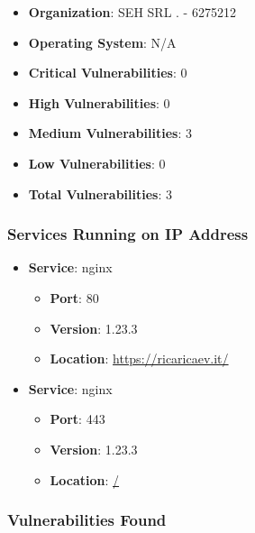 \documentclass{article}
\begin{document}
\begin{itemize}
    \item \textbf{Organization}: SEH SRL . - 6275212
    \item \textbf{Operating System}:  N/A 
    \item \textbf{Critical Vulnerabilities}: 0
    \item \textbf{High Vulnerabilities}: 0
    \item \textbf{Medium Vulnerabilities}: 3
    \item \textbf{Low Vulnerabilities}: 0
    \item \textbf{Total Vulnerabilities}: 3
\end{itemize}

\subsubsection*{Services Running on IP Address}

\begin{itemize}
    
        \item \textbf{Service}: nginx
        \begin{itemize}
            \item \textbf{Port}: 80
            \item \textbf{Version}:  1.23.3 
            \item \textbf{Location}: \href{ https://ricaricaev.it/ }{ https://ricaricaev.it/ }
        \end{itemize}
    
        \item \textbf{Service}: nginx
        \begin{itemize}
            \item \textbf{Port}: 443
            \item \textbf{Version}:  1.23.3 
            \item \textbf{Location}: \href{ / }{ / }
        \end{itemize}
    
\end{itemize}


\subsubsection*{Vulnerabilities Found}
\end{document}

